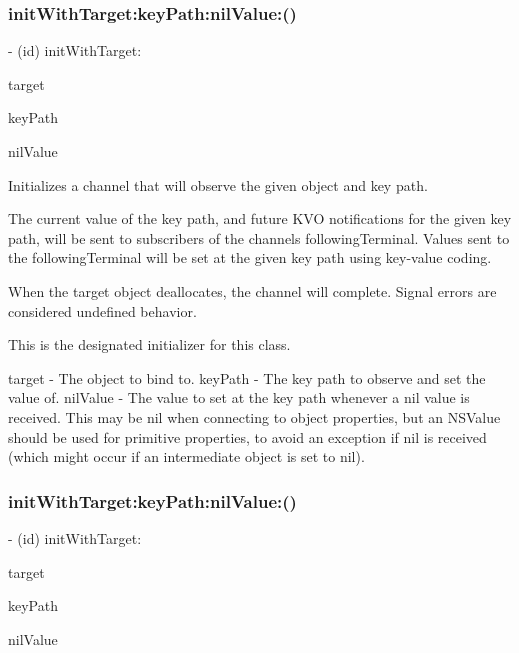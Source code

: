 \subsubsection{\texorpdfstring{init\+With\+Target\+:key\+Path\+:nil\+Value\+:()}{initWithTarget:keyPath:nilValue:()}\hspace{0.1cm}{\footnotesize\ttfamily [2/3]}}
{\footnotesize\ttfamily -\/ (id) init\+With\+Target\+: \begin{DoxyParamCaption}\item[{(\+\_\+\+\_\+weak N\+S\+Object $\ast$)}]{target }\item[{keyPath:(N\+S\+String $\ast$)}]{key\+Path }\item[{nilValue:(id)}]{nil\+Value }\end{DoxyParamCaption}}

Initializes a channel that will observe the given object and key path.

The current value of the key path, and future K\+VO notifications for the given key path, will be sent to subscribers of the channel\textquotesingle{}s {\ttfamily following\+Terminal}. Values sent to the {\ttfamily following\+Terminal} will be set at the given key path using key-\/value coding.

When the target object deallocates, the channel will complete. Signal errors are considered undefined behavior.

This is the designated initializer for this class.

target -\/ The object to bind to. key\+Path -\/ The key path to observe and set the value of. nil\+Value -\/ The value to set at the key path whenever a {\ttfamily nil} value is received. This may be nil when connecting to object properties, but an N\+S\+Value should be used for primitive properties, to avoid an exception if {\ttfamily nil} is received (which might occur if an intermediate object is set to {\ttfamily nil}). \mbox{\label{interface_r_a_c_k_v_o_channel_a4a6f2925587bdcaf90419bae2da284a4}} 
\subsubsection{\texorpdfstring{init\+With\+Target\+:key\+Path\+:nil\+Value\+:()}{initWithTarget:keyPath:nilValue:()}\hspace{0.1cm}{\footnotesize\ttfamily [3/3]}}
{\footnotesize\ttfamily -\/ (id) init\+With\+Target\+: \begin{DoxyParamCaption}\item[{(\+\_\+\+\_\+weak N\+S\+Object $\ast$)}]{target }\item[{keyPath:(N\+S\+String $\ast$)}]{key\+Path }\item[{nilValue:(id)}]{nil\+Value }\end{DoxyParamCaption}}

